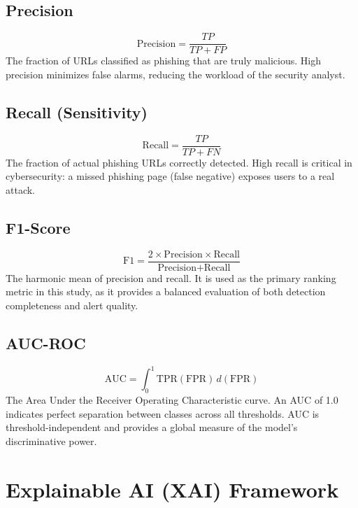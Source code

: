 \subsection{Precision}
\begin{equation}
    \text{Precision} = \frac{TP}{TP + FP}
\end{equation}
The fraction of URLs classified as phishing that are truly malicious. High precision minimizes false alarms, reducing the workload of the security analyst.

\subsection{Recall (Sensitivity)}
\begin{equation}
    \text{Recall} = \frac{TP}{TP + FN}
\end{equation}
The fraction of actual phishing URLs correctly detected. High recall is critical in cybersecurity: a missed phishing page (false negative) exposes users to a real attack.

\subsection{F1-Score}
\begin{equation}
    \text{F1} = \frac{2 \times \text{Precision} \times \text{Recall}}{\text{Precision} + \text{Recall}}
\end{equation}
The harmonic mean of precision and recall. It is used as the primary ranking metric in this study, as it provides a balanced evaluation of both detection completeness and alert quality.

\subsection{AUC-ROC}
\begin{equation}
    \text{AUC} = \int_0^1 \text{TPR}(\text{FPR})\, d(\text{FPR})
\end{equation}
The Area Under the Receiver Operating Characteristic curve. An AUC of 1.0 indicates perfect separation between classes across all thresholds. AUC is threshold-independent and provides a global measure of the model's discriminative power.

\section{Explainable AI (XAI) Framework}

